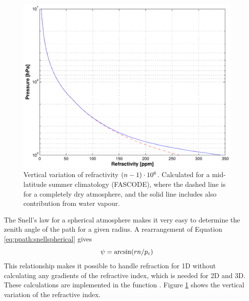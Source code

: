 \begin{figure}[tb!]
 \begin{center}
  \includegraphics*[width=0.7\hsize]{ppath_N}
  \caption{Vertical variation of refractivity $(n-1)\cdot10^{6}$.
     Calculated for a mid-latitude summer climatology (FASCODE), where
     the dashed line is for a completely dry atmosphere, and the solid line
     includes also contribution from water vapour.}
  \label{fig:ppath:N}  
 \end{center}
\end{figure}

The Snell's law for a spherical atmosphere makes it very easy to
determine the zenith angle of the path for a given radius. A
rearrangement of Equation \ref{eq:ppath:snellspherical} gives
\begin{equation}
  \psi = \arcsin( r n / p_c )
 \label{eq:ppath:za1D}
\end{equation}
This relationship makes it possible to handle refraction for 1D
without calculating any gradients of the refractive index, which is
needed for 2D and 3D. These calculations are implemented in the
function .
Figure \ref{fig:ppath:N} shows the vertical variation of the
refractive index.





